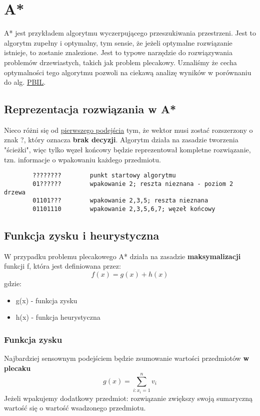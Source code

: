 \documentclass[11pt]{article}
\begin{document}
\section{A*}
\label{sec:orgd1b064a}
A* jest przykładem algorytmu wyczerpującego przeszukiwania przestrzeni. Jest to algorytm zupełny i optymalny, tym sensie, że jeżeli optymalne rozwiązanie istnieje, to zostanie znalezione. Jest to typowe narzędzie do rozwiązywania problemów drzewiastych, takich jak problem plecakowy. Uznaliśmy że cecha optymalności tego algorytmu pozwoli na ciekawą analizę wyników w porównaniu do alg. \hyperref[sec:org5c31017]{\uline{PBIL}}.
\subsection{Reprezentacja rozwiązania w A*}
\label{sec:org4ecd5a9}
Nieco różni się od \hyperref[sec:org7c490b7]{pierwszego podejścia} tym, że wektor musi zostać rozszerzony o znak ?, który oznacza \textbf{brak decyzji}. Algorytm działa na zasadzie tworzenia "ścieżki", więc tylko węzeł końcowy będzie reprezentował kompletne rozwiązanie, tzn. informacje o wpakowaniu każdego przedmiotu.
\begin{verbatim}
        ????????        punkt startowy algorytmu
        01??????        wpakowanie 2; reszta nieznana - poziom 2 drzewa
        01101???        wpakowanie 2,3,5; reszta nieznana
        01101110        wpakowanie 2,3,5,6,7; węzeł końcowy
\end{verbatim}
\subsection{Funkcja zysku i heurystyczna}
\label{sec:orgd7b7848}
W przypadku problemu plecakowego A* działa na zasadzie \textbf{maksymalizacji} funkcji f, która jest definiowana przez:
\[
        f(x) = g(x) + h(x)
\]
gdzie:
\begin{itemize}
\item g(x) - funkcja zysku
\item h(x) - funkcja heurystyczna
\end{itemize}
\subsubsection{Funkcja zysku}
\label{sec:orgf97f734}
Najbardziej sensownym podejściem będzie zsumowanie wartości przedmiotów \textbf{w plecaku}
\[
        g(x) = \sum_{i:x_i=1}^n{v_i}
\]
Jeżeli wpakujemy dodatkowy przedmiot: rozwiązanie zwiększy swoją sumaryczną wartość się o wartość wsadzonego przedmiotu.
\end{document}
